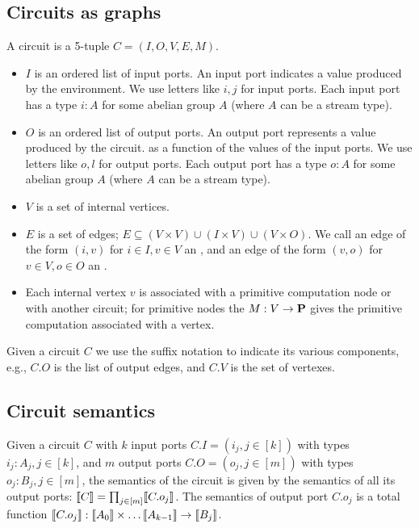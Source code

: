 \subsection{Circuits as graphs}

A circuit is a 5-tuple $C = (I, O, V, E, M)$.

\begin{itemize}
    \item $I$ is an ordered list of input ports.  
    An input port indicates a value produced by the environment.  We use letters like $i, j$
    for input ports.  Each input port has a type $i: A$ for some abelian group $A$  (where $A$ can be a stream type).
    \item $O$ is an ordered list of output ports.  An output port represents a value produced by the circuit.
    as a function of the values of the input ports.  We use letters like $o, l$ for output ports.
    Each output port has a type $o: A$ for some abelian group $A$ (where $A$ can be a stream type).
    \item $V$ is a set of internal vertices.
    \item $E$ is a set of edges; $E \subseteq (V \times V) \cup (I \times V) \cup (V \times O)$.
    We call an edge of the form $(i,v)$ for $i \in I, v \in V$ an , 
    and an edge of the form $(v, o)$ for $v \in V, o \in O$ an .
    \item Each internal vertex $v$ is associated with a primitive computation
    node or with another circuit; 
    for primitive nodes the  $M: V \rightarrow \mathbf{P}$ 
    gives the primitive computation associated with a vertex.
\end{itemize}

Given a circuit $C$ we use the suffix notation to indicate its various components, e.g., 
$C.O$ is the list of output edges, and $C.V$ is the set of vertexes.  


\subsection{Circuit semantics}

Given a circuit $C$ with $k$ input ports $C.I = (i_j, j \in [k])$ with types $i_j: A_j, j \in [k]$,
and $m$ output ports $C.O = (o_j, j \in [m])$ with types $o_j: B_j, j \in [m]$,
the semantics of the circuit is given by the semantics of all its output ports: 
$\llbracket C \rrbracket = \prod_{j \in [m]} \llbracket C.o_j \rrbracket$.
The semantics of output port $C.o_j$ is a total function
$\llbracket C.o_j \rrbracket : \llbracket A_0 \rrbracket \times \ldots \llbracket A_{k-1} \rrbracket \rightarrow \llbracket B_j \rrbracket$.

